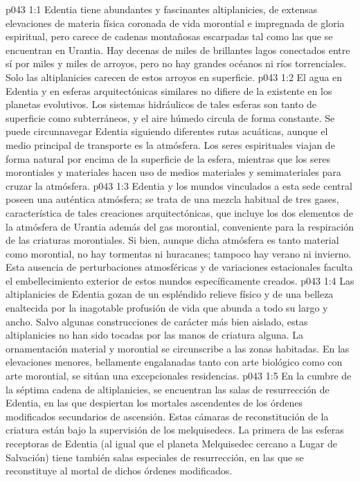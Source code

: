 \vs p043 1:1 Edentia tiene abundantes y fascinantes altiplanicies, de extensas elevaciones de materia física coronada de vida morontial e impregnada de gloria espiritual, pero carece de cadenas montañosas escarpadas tal como las que se encuentran en Urantia. Hay decenas de miles de brillantes lagos conectados entre sí por miles y miles de arroyos, pero no hay grandes océanos ni ríos torrenciales. Solo las altiplanicies carecen de estos arroyos en superficie.
\vs p043 1:2 El agua en Edentia y en esferas arquitectónicas similares no difiere de la existente en los planetas evolutivos. Los sistemas hidráulicos de tales esferas son tanto de superficie como subterráneos, y el aire húmedo circula de forma constante. Se puede circunnavegar Edentia siguiendo diferentes rutas acuáticas, aunque el medio principal de transporte es la atmósfera. Los seres espirituales viajan de forma natural por encima de la superficie de la esfera, mientras que los seres morontiales y materiales hacen uso de medios materiales y semimateriales para cruzar la atmósfera.
\vs p043 1:3 Edentia y los mundos vinculados a esta sede central poseen una auténtica atmósfera; se trata de una mezcla habitual de tres gases, característica de tales creaciones arquitectónicas, que incluye los dos elementos de la atmósfera de Urantia además del gas morontial, conveniente para la respiración de las criaturas morontiales. Si bien, aunque dicha atmósfera es tanto material como morontial, no hay tormentas ni huracanes; tampoco hay verano ni invierno. Esta ausencia de perturbaciones atmosféricas y de variaciones estacionales faculta el embellecimiento exterior de estos mundos específicamente creados.
\vs p043 1:4 Las altiplanicies de Edentia gozan de un espléndido relieve físico y de una belleza enaltecida por la inagotable profusión de vida que abunda a todo su largo y ancho. Salvo algunas construcciones de carácter más bien aislado, estas altiplanicies no han sido tocadas por las manos de criatura alguna. La ornamentación material y morontial se circunscribe a las zonas habitadas. En las elevaciones menores, bellamente engalanadas tanto con arte biológico como con arte morontial, se sitúan una excepcionales residencias.
\vs p043 1:5 \pc En la cumbre de la séptima cadena de altiplanicies, se encuentran las salas de resurrección de Edentia, en las que despiertan los mortales ascendentes de los órdenes modificados secundarios de ascensión. Estas cámaras de reconstitución de la criatura están bajo la supervisión de los melquisedecs. La primera de las esferas receptoras de Edentia (al igual que el planeta Melquisedec cercano a Lugar de Salvación) tiene también salas especiales de resurrección, en las que se reconstituye al mortal de dichos órdenes modificados.
